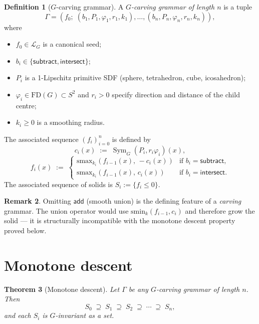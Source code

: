 \documentclass[11pt]{article}
\newtheorem{theorem}{Theorem}
\theoremstyle{definition}
\newtheorem{definition}[theorem]{Definition}
\newtheorem{remark}[theorem]{Remark}
\DeclareMathOperator{\Sym}{Sym}
\begin{document}
\begin{definition}[$G$-carving grammar]
A \emph{$G$-carving grammar of length $n$} is a tuple
\[
  \Gamma = (f_0;\; (b_1, P_1, \varphi_1, r_1, k_1), \dots,
           (b_n, P_n, \varphi_n, r_n, k_n)),
\]
where
\begin{itemize}
\item $f_0 \in \mathcal{L}_G$ is a canonical seed;
\item $b_i \in \{\mathsf{subtract}, \mathsf{intersect}\}$;
\item $P_i$ is a 1-Lipschitz primitive SDF (sphere, tetrahedron, cube,
      icosahedron);
\item $\varphi_i \in \mathrm{FD}(G) \subset S^2$ and $r_i > 0$ specify
      direction and distance of the child centre;
\item $k_i \ge 0$ is a smoothing radius.
\end{itemize}
The associated sequence $(f_i)_{i=0}^{n}$ is defined by
\[
  c_i(x) \;:=\; \Sym_G(P_i, r_i \varphi_i)(x),
\]
\[
  f_i(x) \;:=\;
  \begin{cases}
    \mathrm{smax}_{k_i}(f_{i-1}(x),\, -c_i(x)) & \text{if } b_i = \mathsf{subtract},\\
    \mathrm{smax}_{k_i}(f_{i-1}(x),\, c_i(x)) & \text{if } b_i = \mathsf{intersect}.
  \end{cases}
\]
The associated sequence of solids is $S_i := \{f_i \le 0\}$.
\end{definition}

\begin{remark}
Omitting $\mathsf{add}$ (smooth union) is the defining feature of a
\emph{carving} grammar. The union operator would use
$\mathrm{smin}_k(f_{i-1}, c_i)$ and therefore grow the solid --- it is
structurally incompatible with the monotone descent property proved
below.
\end{remark}

\section{Monotone descent}
\label{sec:descent}

\begin{theorem}[Monotone descent]
\label{thm:monotone}
Let $\Gamma$ be any $G$-carving grammar of length $n$. Then
\[
  S_0 \;\supseteq\; S_1 \;\supseteq\; S_2 \;\supseteq\; \cdots
  \;\supseteq\; S_n,
\]
and each $S_i$ is $G$-invariant as a set.
\end{theorem}
\end{document}
